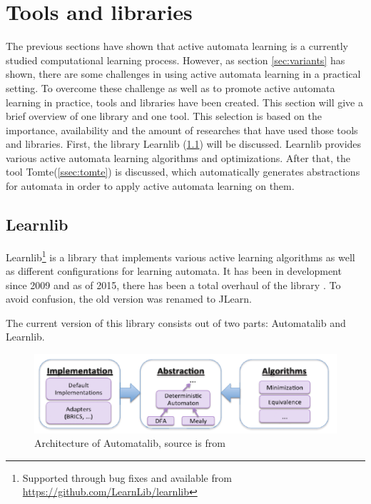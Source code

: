 \documentclass[multi,crop=false,class=article]{standalone}
\begin{document}
\section{Tools and libraries}
\label{sec:tools}
The previous sections have shown that active automata learning is a currently 
studied computational learning process. However, as section 
\ref{sec:variants} has shown, there are some challenges in using active 
automata learning in a practical setting. To overcome these challenge as well 
as to promote active automata learning in practice, tools and libraries have 
been created. This section will give a brief overview of one library and one 
tool. This selection is based on the importance, availability and the amount of 
researches that have used those tools and libraries. First, the library 
Learnlib (\ref{ssec:learnlib}) will be discussed. Learnlib provides various 
active automata learning algorithms and optimizations. After that, the tool 
Tomte(\ref{ssec:tomte}) is discussed, which automatically generates 
abstractions for automata in order to apply active automata learning on them. 

\subsection{Learnlib}
\label{ssec:learnlib}

Learnlib\footnote{Supported through bug fixes and available from
\url{https://github.com/LearnLib/learnlib}} is a library that implements various
active learning algorithms as well as different configurations for learning
automata. It has been in development since 2009 \cite{Raffelt2009} and as of
2015, there has been a total overhaul of the library \cite{Isberner2015b}. To 
avoid confusion, the old version was renamed to JLearn.

The current version of this library consists out of two parts: Automatalib and
Learnlib.

\begin{figure}[!ht]
	\includegraphics[width=\textwidth]{Tool_images/automatalib_architecture.png}
	\caption{Architecture of Automatalib, source is from \cite{Isberner2015b}}
	\label{fig:automatalib_arch}
\end{figure}
\end{document}
